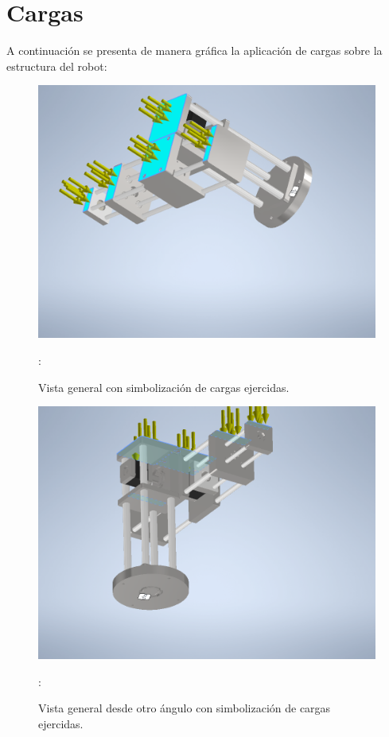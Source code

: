 \documentclass[11pt,a4paper,oldfontcommands,oneside]{memoir}
\begin{document}
\chapter{Cargas}

\begin{flushleft}

A continuación se presenta de manera gráfica la aplicación de cargas sobre la estructura del robot:

\begin{figure}
\begin{center}
\includegraphics[scale=.55]{c1.png} 
\end{center}
\caption{Vista general con simbolización de cargas ejercidas.}
\label{tabla7}:
\end{figure}

\begin{figure}
\begin{center}
\includegraphics[scale=.55]{c2.png} 
\end{center}
\caption{Vista general desde otro ángulo con simbolización de cargas ejercidas.}
\label{tabla8}:
\end{figure}

\end{flushleft}
\end{document}
